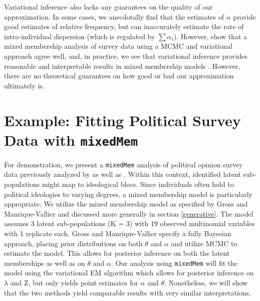\documentclass{article}
\begin{document}
Variational inference also lacks any guarantees on the quality of our approximation. In some cases, we anecdotally find that the estimates of $\alpha$ provide good estimates of relative frequency, but can inaccurately estimate the rate of intra-individual dispersion (which is regulated by $\sum \alpha_i$). However, \cite{erosheva2007describing} show that a mixed membership analysis of survey data using a MCMC and variational approach agree well, and, in practice, we see that variational inference provides reasonable and interpretable results in mixed membership models \citep{LDA, erosheva2004mixed, airoldi2009mixed}. However, there are no theoretical guarantees on how good or bad our approximation ultimately is.

\section{Example: Fitting Political Survey Data with \texttt{mixedMem}} \label{politicalSurvey}
For demonstration, we present a \texttt{mixedMem} analysis of political opinion survey data previously analyzed by  \cite{grossManriqueVallier} as well as \cite{feldman1988structure}. Within this context, identified latent sub-populations might map to ideological blocs. Since individuals often hold to political ideologies to varying degrees, a mixed membership model is particularly appropriate. We utilize the mixed membership model as specified by Gross and Manrique-Vallier and discussed more generally in section \ref{generative}. The model assumes 3 latent sub-populations (K = 3) with 19 observed multinomial variables with 1 replicate each. Gross and Manrique-Vallier specify a fully Bayesian approach, placing prior distributions on both $\theta$ and $\alpha$ and utilize MCMC to estimate the model. This allows for posterior inference on both the latent memberships as well as on $\theta$ and $\alpha$. Our analysis using \texttt{mixedMem} will fit the model using the variational EM algorithm  which allows for posterior inference on $\lambda$ and Z, but only yields point estimates for $\alpha$ and $\theta$. Nonetheless, we will show that the two methods yield comparable results with very similar interpretations.
\end{document}
